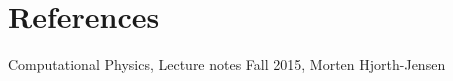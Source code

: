 \documentclass{aa}   %
\begin{document}

\section{References}
Computational Physics, Lecture notes Fall 2015, Morten Hjorth-Jensen

\end{document}
